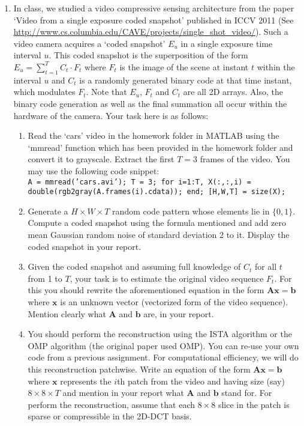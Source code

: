 \documentclass[11pt]{article}
\begin{document}
\begin{enumerate}
\item In class, we studied a video compressive sensing architecture from the paper `Video from a single exposure coded snapshot' published in ICCV 2011 (See \url{http://www.cs.columbia.edu/CAVE/projects/single_shot_video/}). Such a video camera acquires a `coded snapshot' $E_u$ in a single exposure time interval $u$. This coded snapshot is the superposition of the form $E_u = \sum_{t=1}^T C_t \cdot F_t$ where $F_t$ is the image of the scene at instant $t$ within the interval $u$ and $C_t$ is a randomly generated binary code at that time instant, which modulates $F_t$. Note that $E_u$, $F_t$ and $C_t$ are all 2D arrays. Also, the binary code generation as well as the final summation all occur within the hardware of the camera. Your task here is as follows:
\begin{enumerate}
\item Read the `cars' video in the homework folder in MATLAB using the `mmread' function which has been provided in the homework folder and convert it to grayscale. Extract the first $T = 3$ frames of the video. You may use the following code snippet: \\
\texttt{A = mmread('cars.avi');
T = 3;
for i=1:T,  X(:,:,i) = double(rgb2gray(A.frames(i).cdata)); end;
[H,W,T] = size(X);
}
\item Generate a $H \times W \times T$ random code pattern whose elements lie in $\{0,1\}$. Compute a coded snapshot using the formula mentioned and add zero mean Gaussian random noise of standard deviation 2 to it. Display the coded snapshot in your report.
\item Given the coded snapshot and assuming full knowledge of $C_t$ for all $t$ from 1 to $T$, your task is to estimate the original video sequence $F_t$. For this you should rewrite the aforementioned equation in the form $\boldsymbol{Ax} = \boldsymbol{b}$ where $\boldsymbol{x}$ is an unknown vector (vectorized form of the video sequence). Mention clearly what $\boldsymbol{A}$ and $\boldsymbol{b}$ are, in your report.
\item You should perform the reconstruction using the ISTA algorithm or the OMP algorithm (the original paper used OMP). You can re-use your own code from a previous assignment. For computational efficiency, we will do this reconstruction patchwise. Write an equation of the form $\boldsymbol{Ax} = \boldsymbol{b}$ where $\boldsymbol{x}$ represents the $i$th patch from the video and having size (say) $8 \times 8 \times T$ and mention in your report what $\boldsymbol{A}$ and $\boldsymbol{b}$ stand for. For perform the reconstruction, assume that each $8 \times 8$ slice in the patch is sparse or compressible in the 2D-DCT basis. 

\end{enumerate}
\end{enumerate}
\end{document}
